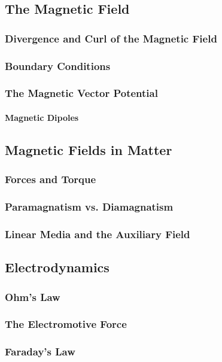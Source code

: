 \documentclass[a4paper]{article}
\begin{document}
    \subsection{The Magnetic Field}
    \subsubsection{Divergence and Curl of the Magnetic Field}
    \subsubsection{Boundary Conditions}
    \subsubsection{The Magnetic Vector Potential}
    \paragraph{Magnetic Dipoles}
    \subsection{Magnetic Fields in Matter}
    \subsubsection{Forces and Torque}
    \subsubsection{Paramagnatism vs. Diamagnatism}
    \subsubsection{Linear Media and the Auxiliary Field}
    \subsection{Electrodynamics}
    \subsubsection{Ohm's Law}
    \subsubsection{The Electromotive Force}
    \subsubsection{Faraday's Law}
\end{document}
